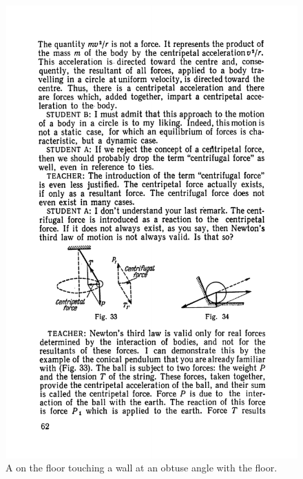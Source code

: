 \documentclass[a4paper,sfsidenotes]{tufte-book}
\begin{document}
\begin{figure}
\centering
\includegraphics[width=0.6\linewidth]{fig-034a.pdf}
\caption{A on the floor touching a wall at an obtuse angle with the floor.}
\label{fig-34}
\end{figure}
\end{document}
